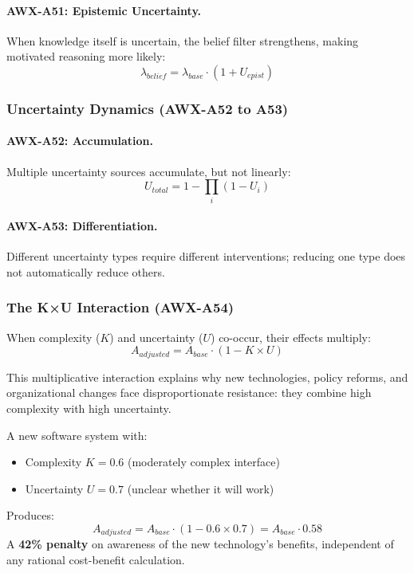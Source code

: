\paragraph{AWX-A51: Epistemic Uncertainty.}
When knowledge itself is uncertain, the belief filter strengthens, 
making motivated reasoning more likely:
\begin{equation}
\lambda_{belief} = \lambda_{base} \cdot (1 + U_{epist})
\end{equation}

\subsubsection{Uncertainty Dynamics (AWX-A52 to A53)}

\paragraph{AWX-A52: Accumulation.}
Multiple uncertainty sources accumulate, but not linearly:
\begin{equation}
U_{total} = 1 - \prod_{i}(1 - U_i)
\end{equation}

\paragraph{AWX-A53: Differentiation.}
Different uncertainty types require different interventions; reducing 
one type does not automatically reduce others.

\subsubsection{The K×U Interaction (AWX-A54)}

\begin{axiom}
When complexity ($K$) and uncertainty ($U$) co-occur, their effects multiply:
\begin{equation}
A_{adjusted} = A_{base} \cdot (1 - K \times U)
\label{eq:kxu-interaction}
\end{equation}
\end{axiom}

This multiplicative interaction explains why new technologies, policy reforms, 
and organizational changes face disproportionate resistance: they combine 
high complexity with high uncertainty.

\begin{example}
A new software system with:
\begin{itemize}
    \item Complexity $K = 0.6$ (moderately complex interface)
    \item Uncertainty $U = 0.7$ (unclear whether it will work)
\end{itemize}
Produces:
\[
A_{adjusted} = A_{base} \cdot (1 - 0.6 \times 0.7) = A_{base} \cdot 0.58
\]
A \textbf{42\% penalty} on awareness of the new technology's benefits, 
independent of any rational cost-benefit calculation.
\end{example}

